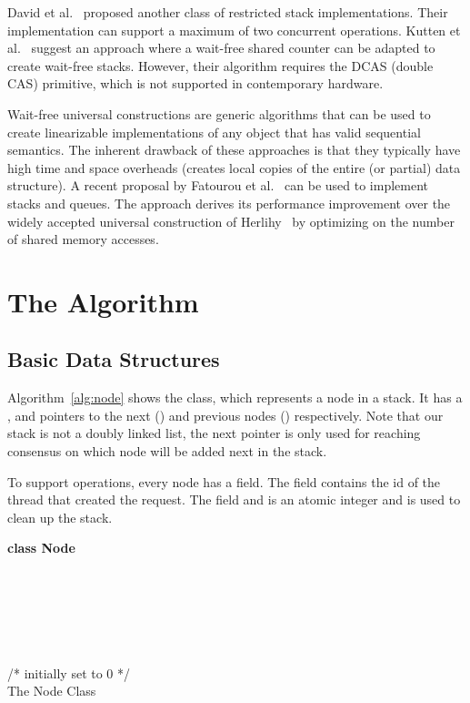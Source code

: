 \documentclass{llncs}
\begin{document}
David et al.~\cite{restrictedStack} proposed another class of
 restricted stack implementations.
Their implementation can support a maximum of two concurrent  operations.
Kutten et al.~\cite{WaitFreeSharedCounter1,WaitFreeSharedCounter2} suggest an
approach where a wait-free shared counter can be adapted to
create wait-free stacks. However, their algorithm requires the DCAS (double
CAS) primitive, which is not supported in contemporary hardware. 

Wait-free universal constructions are generic algorithms that can be used to create linearizable implementations of any
object that has valid sequential semantics.  The inherent drawback of these approaches is that they typically have
high time and space overheads (creates local copies of the entire (or partial) data structure).
  A recent proposal by Fatourou et al.~\cite{newUniversal} can be used to implement stacks
and queues.  The approach derives its performance improvement over the widely accepted universal construction of
Herlihy~\cite{oldUniversal} by optimizing on the number of shared memory accesses. 
\section{The Algorithm}

\subsection{Basic Data Structures}
Algorithm~\ref{alg:node} shows the  class, which represents a node in a stack. 
It has a , and pointers to the next () and previous nodes () respectively.
Note that our stack is not a doubly linked list, the next pointer  is only used for reaching consensus on which node will be added next in the stack. 

 To support  operations, every node has a  field. The  field contains 
the id of the thread that created the request. The  field and  is an atomic integer and is used 
to clean up the stack.
\vspace{-6mm}
\begin{algorithm}
\scriptsize
\SetAlgoLined
\textbf{class Node}{}\\
		\hspace{5mm} \\
		\hspace{5mm} \\
		\hspace{5mm} \\
		\hspace{5mm} \\
		\hspace{5mm} \\
		\hspace{5mm} \\	
		\hspace{5mm}   /* initially set to 0 */\\ 	
\caption{The Node Class} \label{alg:node}
\end{algorithm}
\vspace{-6mm}
\end{document}
